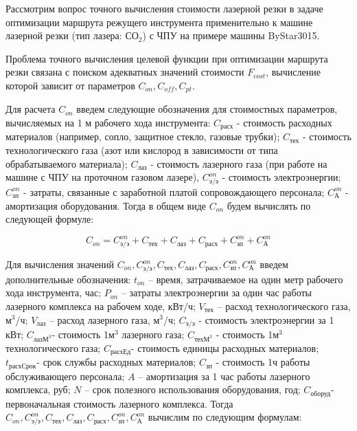 \documentclass{article}
\begin{document}
Рассмотрим вопрос точного вычисления
стоимости лазерной резки в задаче
оптимизации маршрута режущего инструмента
применительно к машине лазерной резки (тип лазера: СО$_2$)
с ЧПУ на примере машины ByStar3015.

Проблема точного вычисления целевой функции
при оптимизации маршрута резки связана с
поиском адекватных значений стоимости
$F_{cost}$,
вычисление которой зависит от параметров
$C_{on}, C_{off}, C_{pt}$.

Для расчета
$C_{on}$
введем следующие обозначения для стоимостных параметров,
вычисляемых на 1 м рабочего хода инструмента:
$C_\text{расх}$   - стоимость расходных материалов (например, сопло, защитное стекло, газовые трубки);
$C_\text{тех}$   - стоимость технологического газа (азот или кислород в зависимости от типа обрабатываемого материала);
$C_\text{лаз}$ - стоимость лазерного газа (при работе на машине с ЧПУ на проточном газовом лазере),
$C_\text{э/э}^{on}$ - стоимость электроэнергии;
$C_\text{зп}^{on}$ - затраты, связанные с заработной платой сопровождающего персонала;
$C_\text{А}^{on}$ - амортизация оборудования.
Тогда в общем виде
$C_{on}$
будем вычислять по следующей формуле:

\begin{equation}
  C_{on} =
  C_\text{э/э}^{on} +
  C_\text{тех} +
  C_\text{лаз} +
  C_\text{расх} +
  C_\text{зп}^{on} +
  C_\text{А}^{on}
  \label{c-on}
\end{equation}

Для вычисления значений
$C_{on}, C_\text{э/э}^{on}, C_\text{тех}, C_\text{лаз}, C_\text{расх}, C_\text{зп}^{on}, C_\text{А}^{on}$
введем дополнительные обозначения:
$t_{on}$ – время, затрачиваемое на один метр рабочего хода инструмента, час;
$P_{on}$ – затраты электроэнергии за один час работы лазерного комплекса на рабочем ходе, кВт/ч;
$V_\text{тех}$ – расход технологического газа, м$^3$/ч;
$V_\text{лаз}$ – расход лазерного газа, м$^3$/ч;
$C_\text{э/э}$ - стоимость электроэнергии за 1 кВт;
$C_{\text{лазМ}^3}$- стоимость 1м$^3$ лазерного газа;
$C_{\text{техМ}^3}$ - стоимость 1м$^3$ технологического газа;
$C_\text{расхЕд}$- стоимость единицы расходных материалов;
$t_\text{расхСрок}$- срок службы расходных материалов;
$C_\text{зп}$ - стоимость 1ч работы обслуживающего персонала;
$A$ – амортизация за 1 час работы лазерного комплекса, руб;
$N$ – срок полезного использования оборудования, год;
$C_\text{оборуд}$- первоначальная стоимость лазерного комплекса. Тогда
$C_{on}, C_\text{э/э}^{on}, C_\text{тех}, C_\text{лаз}, C_\text{расх}, C_\text{зп}^{on}, C_\text{А}^{on}$
вычислим по следующим формулам:
\end{document}
